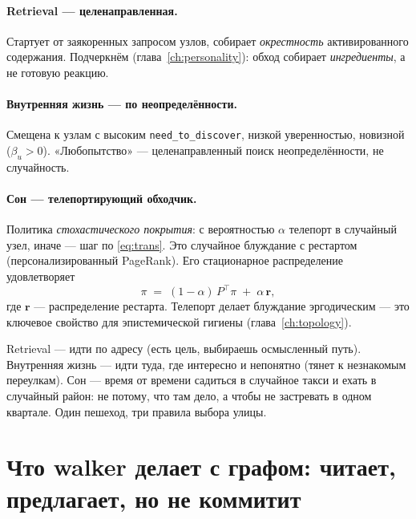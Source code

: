 \paragraph{Retrieval — целенаправленная.} Стартует от заякоренных запросом узлов,
собирает \emph{окрестность} активированного содержания. Подчеркнём (глава~\ref{ch:personality}):
обход собирает \emph{ингредиенты}, а не готовую реакцию.

\paragraph{Внутренняя жизнь — по неопределённости.} Смещена к узлам с высоким
\texttt{need\_to\_discover}, низкой уверенностью, новизной ($\beta_u>0$).
«Любопытство» — целенаправленный поиск неопределённости, не случайность.

\paragraph{Сон — телепортирующий обходчик.} Политика \emph{стохастического
покрытия}: с вероятностью $\alpha$ телепорт в случайный узел, иначе — шаг по
\eqref{eq:trans}. Это случайное блуждание с рестартом (персонализированный
PageRank). Его стационарное распределение удовлетворяет
\begin{equation}
\pi \;=\; (1-\alpha)\,P^\top \pi \;+\; \alpha\, \mathbf{r},
\label{eq:ppr}
\end{equation}
где $\mathbf{r}$ — распределение рестарта. Телепорт делает блуждание эргодическим —
это ключевое свойство для эпистемической гигиены (глава~\ref{ch:topology}).

\begin{intuition}
Retrieval — идти по адресу (есть цель, выбираешь осмысленный путь). Внутренняя
жизнь — идти туда, где интересно и непонятно (тянет к незнакомым переулкам). Сон —
время от времени садиться в случайное такси и ехать в случайный район: не потому,
что там дело, а чтобы не застревать в одном квартале. Один пешеход, три правила
выбора улицы.
\end{intuition}

\section{Что walker делает с графом: читает, предлагает, но не коммитит}
\label{sec:proposecommit}

